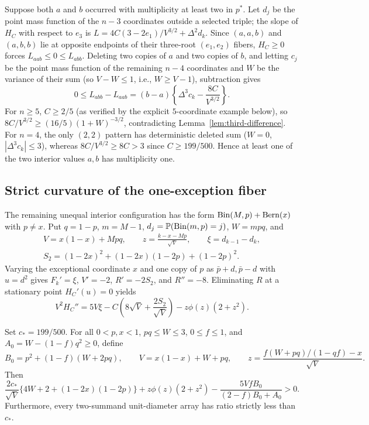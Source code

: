 Suppose both $a$ and $b$ occurred with multiplicity at least two in $p^*$.
Let $d_j$ be the point mass function of the $n-3$ coordinates outside a
selected triple; the slope of $H_C$ with respect to $e_3$ is
$L=4C(3-2e_1)/V^{3/2}+\Delta^2d_k$. Since $(a,a,b)$ and $(a,b,b)$ lie at
opposite endpoints of their three-root $(e_1,e_2)$ fibers, $H_C\ge0$ forces
$L_{aab}\le0\le L_{abb}$. Deleting two copies of $a$ and two copies of $b$,
and letting $c_j$ be the point mass function of the remaining $n-4$
coordinates and $W$ be the variance of their sum (so $V-W\le1$, i.e.,
$W\ge V-1$), subtraction gives
\[
 0\le L_{abb}-L_{aab}
       =(b-a)\left\{\Delta^3c_k-\frac{8C}{V^{3/2}}\right\}.
\]
For $n\ge5$, $C\ge2/5$ (as verified by the explicit $5$-coordinate example
below), so $8C/V^{3/2}\ge(16/5)(1+W)^{-3/2}$, contradicting
Lemma~\ref{lem:third-difference}. For $n=4$, the only $(2,2)$ pattern has
deterministic deleted sum ($W=0$, $|\Delta^3c_k|\le3$), whereas
$8C/V^{3/2}\ge8C>3$ since $C\ge199/500$. Hence at least one of the two
interior values $a,b$ has multiplicity one.

\subsection{Strict curvature of the one-exception fiber}

The remaining unequal interior configuration has the form
$\operatorname{Bin}(M,p)+\operatorname{Bern}(x)$ with $p\ne x$. Put $q=1-p$, $m=M-1$,
$d_j=\mathbb P(\operatorname{Bin}(m,p)=j)$, $W=mpq$, and
\begin{gather*}
 V=x(1-x)+Mpq,\qquad z=\frac{k-x-Mp}{\sqrt V},\qquad
 \xi=d_{k-1}-d_k,\\
 S_2=(1-2x)^2+(1-2x)(1-2p)+(1-2p)^2.
\end{gather*}
Varying the exceptional coordinate $x$ and one copy of $p$ as
$\bar p+d,\bar p-d$ with $u=d^2$ gives $F_k'=\xi$, $V'=-2$, $R'=-2S_2$, and
$R''=-8$. Eliminating $R$ at a stationary point $H_C'(u)=0$ yields
\begin{equation}\label{eq:fiber-curvature}
 V^2H_C''=5V\xi-C\left(8\sqrt V+\frac{2S_2}{\sqrt V}\right)
                       -z\phi(z)(2+z^2).
\end{equation}

\begin{lemma}\label{lem:certified-curvature}
Set $c_*=199/500$. For all $0<p,x<1$, $pq\le W\le3$, $0\le f\le1$, and
$A_0=W-(1-f)q^2\ge0$, define
\[
 B_0=p^2+(1-f)(W+2pq),\qquad V=x(1-x)+W+pq,
 \qquad z=\frac{f(W+pq)/(1-qf)-x}{\sqrt V}.
\]
Then
\begin{equation}\label{eq:compact-curvature}
 \frac{2c_*}{\sqrt V}\bigl\{4W+2+(1-2x)(1-2p)\bigr\}
 +z\phi(z)(2+z^2)
 -\frac{5VfB_0}{(2-f)B_0+A_0}>0.
\end{equation}
Furthermore, every two-summand unit-diameter array has ratio strictly less
than $c_*$.
\end{lemma}

